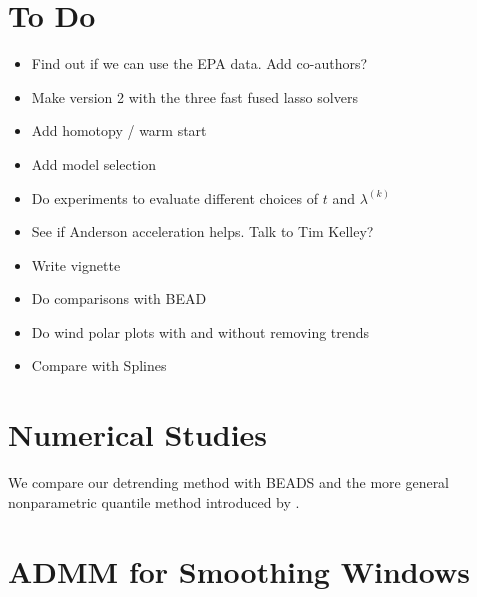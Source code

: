 \documentclass[12pt]{article}
\numberwithin{equation}{section}
\theoremstyle{plain}
\begin{document}
\section{To Do}

\begin{itemize}
	\item Find out if we can use the EPA data. Add co-authors?
	\item Make version 2 with the three fast fused lasso solvers
	\item Add homotopy / warm start
	\item Add model selection
	\item Do experiments to evaluate different choices of $t$ and $\lambda^{(k)}$
	\item See if Anderson acceleration helps. Talk to Tim Kelley?
	\item Write vignette
	\item Do comparisons with BEAD
	\item Do wind polar plots with and without removing trends
	\item Compare with Splines
\end{itemize}

\section{Numerical Studies}

We compare our detrending method with BEADS and the more general nonparametric quantile method introduced by \cite{Oh2011}.


\section{ADMM for Smoothing Windows}
\end{document}
